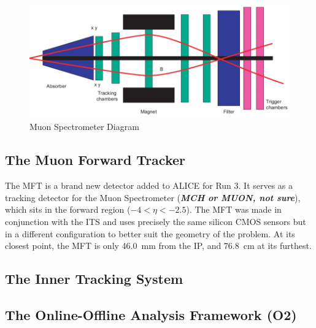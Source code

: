 \documentclass[11pt]{article}
\numberwithin{equation}{section}
\numberwithin{figure}{section}
\numberwithin{table}{section}
\begin{document}
\begin{figure}[h]
    \begin{center}
        \includegraphics[width=.8\textwidth]{Figs/MCH_schematic.png}
        \caption{Muon Spectrometer Diagram}
        \label{fig:Muon Spectrometer}
    \end{center}
\end{figure}








\subsection{The Muon Forward Tracker}
The MFT is a brand new detector added to ALICE for Run 3. It serves as a tracking detector for the Muon Spectrometer (\textit{\textbf{MCH or MUON, not sure}}), which sits in the forward region ($-4<\eta<-2.5$). The MFT was made in conjunction with the ITS and uses precisely the same silicon CMOS sensors but in a different configuration to better suit the geometry of the problem. At its closest point, the MFT is only \SI{46.0}{\milli\metre} from the IP, and \SI{76.8}{\centi\metre} at its furthest. 



\subsection{The Inner Tracking System}




\subsection{The Online-Offline Analysis Framework (O2)}

\printbibliography
\end{document}
